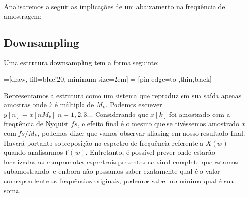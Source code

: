 \documentclass[a4paper, 12pt]{book}
\begin{document}
\indent Analisaremos a seguir as implicações de um abaixamento na frequência de amostragem:

\subsection{Downsampling}

Uma estrutura downsampling tem a forma seguinte:

=[draw, fill=blue!20, minimum size=2em]
 = [pin edge={to-,thin,black}]

\begin{center}
\end{center}


Representamos a estrutura como um sistema que reproduz em sua saída apenas amostras onde $k$ é múltiplo de $M_k$. Podemos escrever $y[n]=x[nM_k] \; n=1,2,3...$ Considerando que $x[k]$ foi amostrado com a frequência de Nyquist $fs$, o efeito final é o mesmo que se tivéssemos amostrado $x$ com $fs/M_k$, podemos dizer que vamos observar aliasing em nosso resultado final. Haverá portanto sobreposição no espectro de frequência referente a $X(w)$ quando analisarmos $Y(w)$. Entretanto, é possível prever onde estarão localizadas as componentes espectrais presentes no sinal completo que estamos subamostrando, e embora não possamos saber exatamente qual é o valor correspondente as frequências originais, podemos saber no mínimo qual é sua soma.
\end{document}
